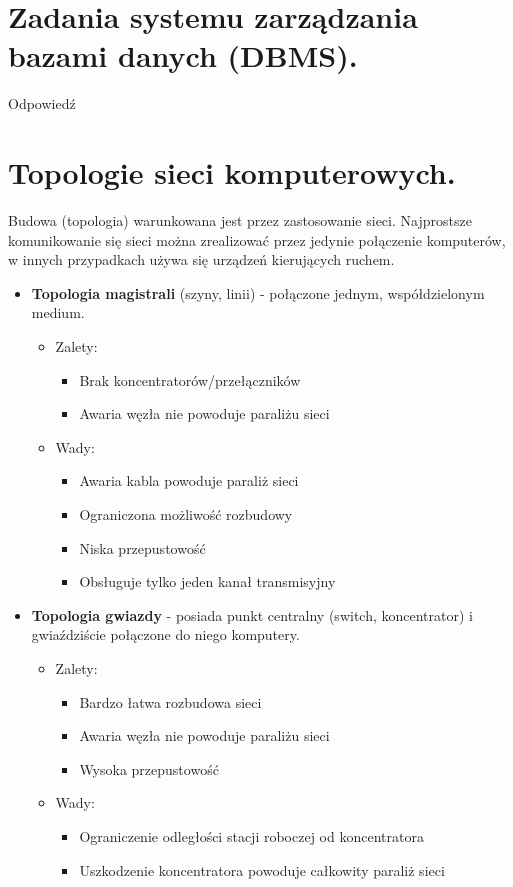 \documentclass[12pt,a4paper]{article}
\begin{document}
	\section{Zadania systemu zarządzania bazami danych (DBMS).}
	Odpowiedź

	\section{Topologie sieci komputerowych.}
	Budowa (topologia) warunkowana jest przez zastosowanie sieci. Najprostsze komunikowanie się sieci można zrealizować przez jedynie połączenie komputerów, w innych przypadkach używa się urządzeń kierujących ruchem.
		
	\begin{itemize}
		\item \textbf{Topologia magistrali} (szyny, linii) - połączone jednym, współdzielonym medium.
		\begin{itemize}
			\item Zalety:
			\begin{itemize}
				\item Brak koncentratorów/przełączników
				\item Awaria węzła nie powoduje paraliżu sieci
			\end{itemize}
			\item Wady:
			\begin{itemize}
				\item Awaria kabla powoduje paraliż sieci
				\item Ograniczona możliwość rozbudowy
				\item Niska przepustowość
				\item Obsługuje tylko jeden kanał transmisyjny
			\end{itemize}
		\end{itemize}
	
		\item \textbf{Topologia gwiazdy} - posiada punkt centralny (switch, koncentrator) i gwiaździście połączone do niego komputery.
		\begin{itemize}
			\item Zalety:
			\begin{itemize}
				\item Bardzo łatwa rozbudowa sieci
				\item Awaria węzła nie powoduje paraliżu sieci
				\item Wysoka przepustowość
			\end{itemize}
			\item Wady:
			\begin{itemize}
				\item Ograniczenie odległości stacji roboczej od koncentratora
				\item Uszkodzenie koncentratora powoduje całkowity paraliż sieci
			\end{itemize}
		\end{itemize}
		

\end{itemize}
\end{document}
